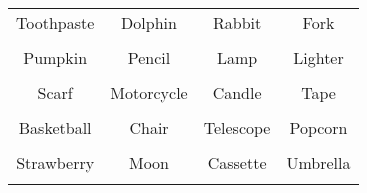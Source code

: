 \documentclass[12pt,a4paper]{article}
\begin{document}
\thispagestyle{empty}
\begin{table}[]
\centering
\Huge
\begin{tabular}{cccc}
 Toothpaste& Dolphin& Rabbit& Fork\\  & & & \\
 Pumpkin& Pencil& Lamp& Lighter\\  & & & \\
 Scarf& Motorcycle& Candle& Tape\\  & & & \\
 Basketball& Chair& Telescope& Popcorn\\  & & & \\
 Strawberry& Moon& Cassette& Umbrella\\  & & & \\
\end{tabular}
\end{table}
\end{document}
